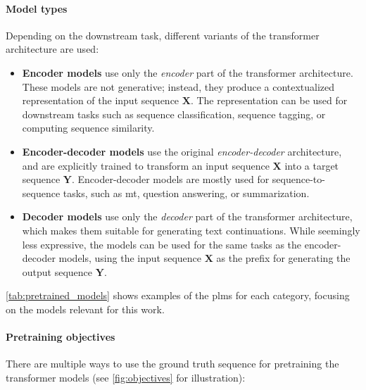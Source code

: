 {\paragraph{Model types} Depending on the downstream task, different variants of the transformer architecture are used:

\begin{itemize}
    \item \textbf{Encoder models} \cite{devlinBERTPretrainingDeep2019,liuRoBERTaRobustlyOptimized2019} use only the \emph{encoder} part of the transformer architecture. These models are not generative; instead, they produce a contextualized representation of the input sequence $\mathbf{X}$. The representation can be used for downstream tasks such as sequence classification, sequence tagging, or computing sequence similarity.
    \item \textbf{Encoder-decoder models} \cite{lewisBARTDenoisingSequencetoSequence2019,raffelExploringLimitsTransfer2019} use the original \emph{encoder-decoder} architecture, and are explicitly trained to transform an input sequence $\mathbf{X}$ into a target sequence $\mathbf{Y}$. Encoder-decoder models are mostly used for sequence-to-sequence tasks, such as \ac{mt}, question answering, or summarization.
    \item \textbf{Decoder models} \cite{radford2018improving,radford2019language} use only the \emph{decoder} part of the transformer architecture, which makes them suitable for generating text continuations. While seemingly less expressive, the models can be used for the same tasks as the encoder-decoder models, using the input sequence $\mathbf{X}$ as the prefix for  generating the output sequence $\mathbf{Y}$.
\end{itemize}

\autoref{tab:pretrained_models} shows examples of the \acp{plm} for each category, focusing on the models relevant for this work.


\paragraph{Pretraining objectives} There are multiple ways to use the ground truth sequence for pretraining the transformer models (see \autoref{fig:objectives} for illustration):


}

